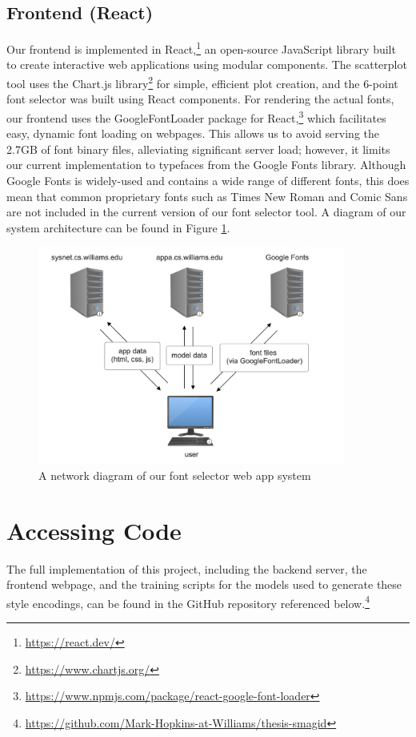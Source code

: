 \subsection{Frontend (React)} \label{frontend}

Our frontend is implemented in React,\footnote{\url{https://react.dev/}} an open-source JavaScript library built to create interactive web applications using modular components. The scatterplot tool uses the Chart.js library\footnote{\url{https://www.chartjs.org/}} for simple, efficient plot creation, and the 6-point font selector was built using React components. For rendering the actual fonts, our frontend uses the GoogleFontLoader package for React,\footnote{\url{https://www.npmjs.com/package/react-google-font-loader}} which facilitates easy, dynamic font loading on webpages. This allows us to avoid serving the 2.7GB of font binary files, alleviating significant server load; however, it limits our current implementation to typefaces from the Google Fonts library. Although Google Fonts is widely-used and contains a wide range of different fonts, this does mean that common proprietary fonts such as Times New Roman and Comic Sans are not included in the current version of our font selector tool. A diagram of our system architecture can be found in Figure \ref{fig:system-diagram}.

\begin{figure}[]
    \centering
    \includegraphics[width=0.9\textwidth]{images/system-diagram.png}
    \caption{A network diagram of our font selector web app system}
    \label{fig:system-diagram}
\end{figure}

\section{Accessing Code}

The full implementation of this project, including the backend server, the frontend webpage, and the training scripts for the models used to generate these style encodings, can be found in the GitHub repository referenced below.\footnote{\url{https://github.com/Mark-Hopkins-at-Williams/thesis-smagid}}